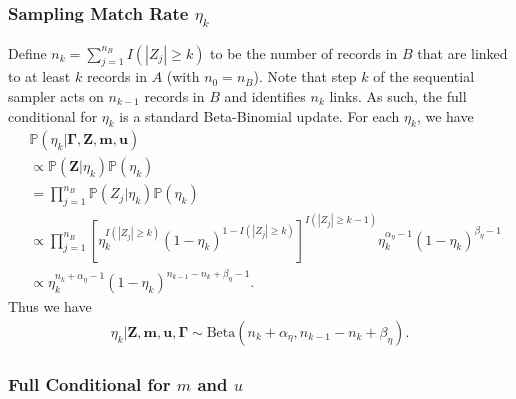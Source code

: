 \documentclass[12pt,letterpaper]{article}
\newcommand{\1}[1]{\mathbb{I}\!\left[#1\right]} %
\begin{document}

\subsubsection{Sampling Match Rate $\eta_k$}\label{app:sample-eta}

Define $n_k = \sum_{j=1}^{n_B} I\left(|Z_j| \geq k\right)$ to be the number of records in $B$ that are linked to at least $k$ records in $A$ (with $n_0 = n_B$). Note that step $k$ of the sequential sampler acts on $n_{k-1}$ records in $B$ and identifies $n_k$ links. As such, the full conditional for $\eta_k$ is a standard Beta-Binomial update. For each $\eta_k$, we have
\begin{align*}
	&\mathbb{P}\left(\eta_k \big| \bm{\Gamma}, \bm{Z}, \bm{m}, \bm{u}\right) \\
	&\propto \mathbb{P}\left(\bm{Z}| \eta_k\right) \mathbb{P}(\eta_k) \\
	&=\prod_{j=1}^{n_B} \mathbb{P}\left(Z_{j} | \eta_k\right) \mathbb{P}(\eta_k) \\
	&\propto \prod_{j=1}^{n_B} \left[\eta_k^{I\left(|Z_j| \geq k \right)} (1 - \eta_k)^{1 - I\left(|Z_j| \geq k \right)}\right]^{I\left(|Z_j| \geq k-1 \right)} \eta_k^{\alpha_{\eta} - 1}(1 - \eta_k)^{\beta_{\eta} - 1} \\
	&\propto \eta_k^{n_{k} + \alpha_{\eta} - 1} (1 - \eta_k)^{n_{k-1} - n_{k} + \beta_{\eta} - 1}.
\end{align*}
Thus we have
\begin{align*}
	\eta_k |\bm{Z}, \bm{m}, \bm{u}, \bm{\Gamma} \sim \text{Beta}\left(n_{k} + \alpha_{\eta}, n_{k-1} - n_{k} + \beta_{\eta} \right).
\end{align*}

\subsubsection{Full Conditional for $m$ and $u$}\label{app:derive-m-u}
\end{document}

